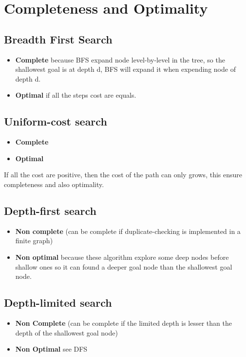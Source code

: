 \section{Completeness and Optimality}
  \subsection{Breadth First Search}
\begin{itemize}
  \item \textbf{Complete} because BFS expand node level-by-level in the tree, so the shallowest goal is at depth d, BFS will expand it when expending node of depth d.
  \item \textbf{Optimal} if all the steps cost are equals.
\end{itemize}

  \subsection{Uniform-cost search}
\begin{itemize}
  \item \textbf{Complete} 
  \item \textbf{Optimal}
\end{itemize}

If all the cost are positive, then the cost of the path can only grows, this ensure completeness and also optimality.

  \subsection{Depth-first search}
\begin{itemize}
  \item \textbf{Non complete} (can be complete if duplicate-checking is implemented in a finite graph) 
  \item \textbf{Non optimal} because these algorithm explore some deep nodes before shallow ones so it can found a deeper goal node than the shallowest goal node.
\end{itemize}

  \subsection{Depth-limited search}
\begin{itemize}
  \item \textbf{Non Complete} (can be complete if the limited depth is lesser than the depth of the shallowest goal node)
  \item \textbf{Non Optimal} see DFS
\end{itemize}

